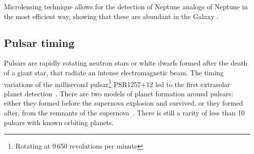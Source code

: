\todo{} Microlensing technique allows for the detection of Neptune analogs of Neptune in the most efficient way, showing that these are abundant in the Galaxy .


\subsection{Pulsar timing}
\label{subsec:pulsar_timing}
Pulsars are rapidly rotating neutron stars or white dwarfs formed after the death of a giant star, that radiate an intense electromagnetic beam.
The timing variations of the millisecond pulsar\footnote{Rotating at 9\,650 revolutions per minute} {PSR1257+12} led to the first extrasolar planet detection~\citep{wolszczan_planetary_1992}.
There are two models of planet formation around pulsars: either they formed before the supernova explosion and survived, or they formed after, from the remnants of the supernova~\citep{starovoit_existence_2017}.
There is still a rarity of less than 10 pulsars with known orbiting planets.

